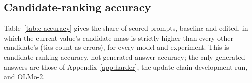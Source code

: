 \begin{table}[h]
\caption{Experiment 1 in models that failed the competence screen, scored descriptively, in the format of Table~\ref{tab:models}, with (b) $+$ (a) added. The recorded criterion (b) $> |$(a)$|$ holds if and only if the lower bounds of both (b) $-$ (a) and (b) $+$ (a) exceed zero. Means with 95\% history-bootstrap intervals over 96 histories, in nats.}
\label{tab:f-excluded}
\begin{center}
\scriptsize
\setlength{\tabcolsep}{4pt}
\end{center}
\end{table}

\subsection{Candidate-ranking accuracy}

Table~\ref{tab:c-accuracy} gives the share of scored prompts, baseline and edited, in which the current value's candidate mass is strictly higher than every other candidate's (ties count as errors), for every model and experiment. This is candidate-ranking accuracy, not generated-answer accuracy; the only generated answers are those of Appendix~\ref{app:harder}, the update-chain development run, and OLMo-2.


